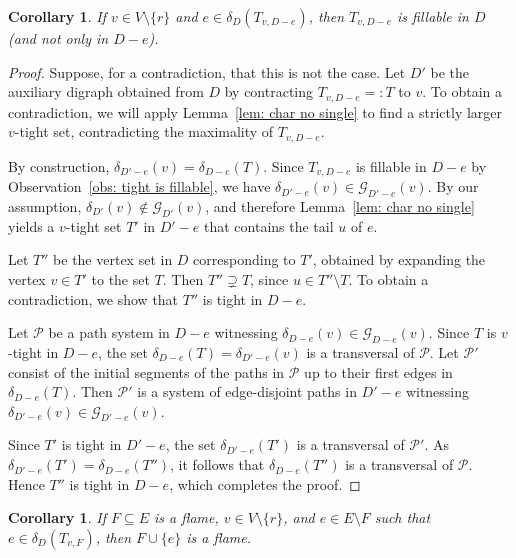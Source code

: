 \documentclass[12pt,a4paper]{amsart}
\theoremstyle{plain}
\newtheorem{corollary}[theorem]{Corollary}
\theoremstyle{definition}
\begin{document}
\begin{corollary}\label{cor: superfillable}
If $v\in V\setminus\{r\}$ and $e\in \delta_D(T_{v,D-e})$, then $T_{v,D-e}$ is fillable in
$D$ (and not only in $D-e$).
\end{corollary}

\begin{proof}
Suppose, for a contradiction, that this is not the case. Let $D'$ be the auxiliary
digraph obtained from $D$ by contracting $T_{v,D-e}=:T$ to $v$. To obtain a contradiction,
we will apply Lemma~\ref{lem: char no single} to find a strictly larger $v$-tight set,
contradicting the maximality of $T_{v,D-e}$.

By construction, $\delta_{D'-e}(v)=\delta_{D-e}(T)$. Since $T_{v,D-e}$ is fillable in
$D-e$ by Observation~\ref{obs: tight is fillable}, we have
$\delta_{D'-e}(v)\in \mathcal{G}_{D'-e}(v)$. By our assumption,
$\delta_{D'}(v)\notin \mathcal{G}_{D'}(v)$, and therefore
Lemma~\ref{lem: char no single} yields a $v$-tight set $T'$ in $D'-e$ that contains the
tail $u$ of $e$.

Let $T''$ be the vertex set in $D$ corresponding to $T'$, obtained by expanding
the vertex $v\in T'$ to the set $T$. Then $T''\supsetneq T$, since
$u\in T''\setminus T$. To obtain a contradiction, we show that $T''$ is tight in $D-e$.

Let $\mathcal{P}$ be a path system in $D-e$ witnessing
$\delta_{D-e}(v)\in \mathcal{G}_{D-e}(v)$. Since $T$ is $v$-tight in $D-e$, the set
$\delta_{D-e}(T)=\delta_{D'-e}(v)$ is a transversal of $\mathcal{P}$. Let $\mathcal{P}'$
consist of the initial segments of the paths in $\mathcal{P}$ up to their first edges in
$\delta_{D-e}(T)$. Then $\mathcal{P}'$ is a system of edge-disjoint paths in $D'-e$
witnessing $\delta_{D'-e}(v)\in \mathcal{G}_{D'-e}(v)$.

Since $T'$ is tight in $D'-e$, the set $\delta_{D'-e}(T')$ is a transversal of
$\mathcal{P}'$. As $\delta_{D'-e}(T')=\delta_{D-e}(T'')$, it follows that
$\delta_{D-e}(T'')$ is a transversal of $\mathcal{P}$. Hence $T''$ is tight in $D-e$,
which completes the proof.
\end{proof}

\begin{corollary}\label{cor: insert one}
If $F\subseteq E$ is a flame, $v\in V\setminus\{r\}$, and $e\in E\setminus F$ such that
$e\in \delta_D(T_{v,F})$, then $F\cup\{e\}$ is a flame.
\end{corollary}
\end{document}
